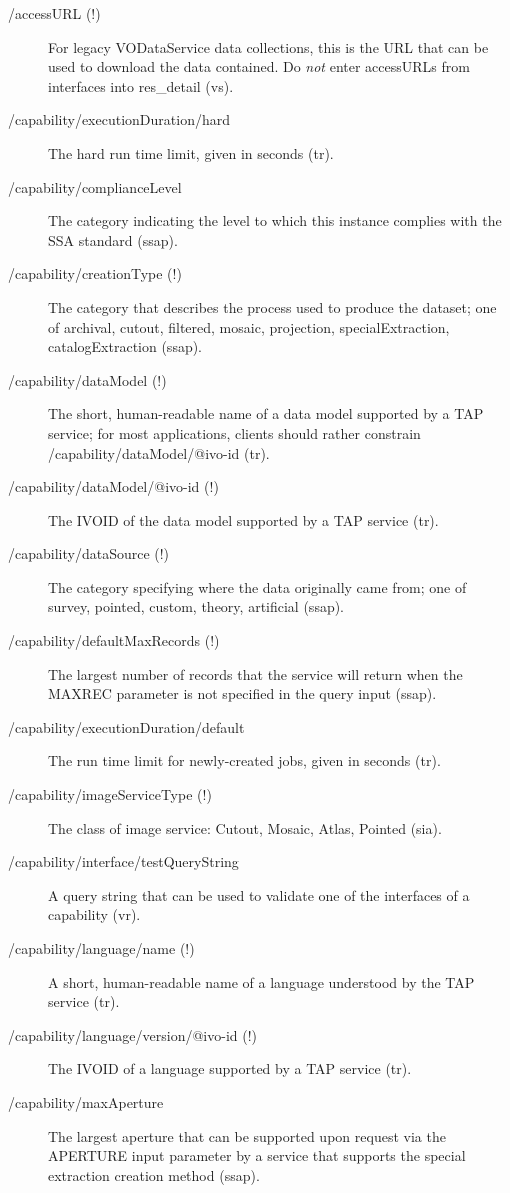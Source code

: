 \documentclass[11pt,a4paper]{ivoa}
\begin{document}
\begin{description}
\item[/accessURL (!)]For legacy VODataService data collections, this is
the URL that can be used to download the data contained.  Do
\emph{not} enter accessURLs from interfaces into res\_detail (vs).
\item[/capability/executionDuration/hard]The hard run time limit, given in seconds (tr).
\item[/capability/complianceLevel]The category indicating the level to which this instance complies with the SSA standard (ssap).
\item[/capability/creationType (!)]The category that describes the process used to produce the dataset; one of archival, cutout, filtered, mosaic, projection, specialExtraction, catalogExtraction (ssap).
\item[/capability/dataModel (!)]The short, human-readable name of a data model supported by a TAP service; for most applications, clients should rather constrain /capability/dataModel/@ivo-id (tr).  
\item[/capability/dataModel/@ivo-id (!)]The IVOID of the data model supported by a TAP service (tr).
\item[/capability/dataSource (!)]The category specifying where the data originally came from; one of survey, pointed, custom, theory, artificial (ssap).
\item[/capability/defaultMaxRecords (!)]The largest number of records that the service will return when the MAXREC parameter is not specified in the query input (ssap).
\item[/capability/executionDuration/default]The run time limit for newly-created jobs, given in seconds (tr).
\item[/capability/imageServiceType (!)]The class of image service: Cutout, Mosaic, Atlas, Pointed (sia).
\item[/capability/interface/testQueryString] A query string that can be
used to validate one of the interfaces of a capability (vr).
\item[/capability/language/name (!)]A short, human-readable name of a language understood by the TAP service (tr).
\item[/capability/language/version/@ivo-id (!)]The IVOID of a language supported by a TAP service (tr).
\item[/capability/maxAperture]The largest aperture that can be supported upon request via the APERTURE input parameter by a service that supports the special extraction creation method (ssap).

\end{description}
\end{document}
